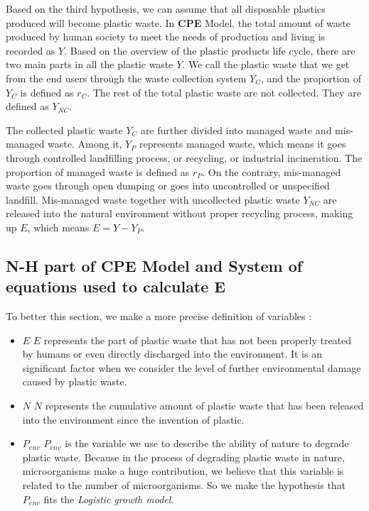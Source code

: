 \documentclass{mcmthesis}
\begin{document}
	 Based on the third hypothesis, we can assume that all disposable plastics produced will become plastic waste. In \textbf{CPE} Model, the total amount of waste produced by human society to meet the needs of production and living is recorded as $Y$. Based on the overview of the plastic products life cycle, there are two main parts in all the plastic waste $Y$. We call the plastic waste that we get from the end users through the waste collection system $Y_{C}$, and the proportion of $Y_C$ is defined as $r_C$. The rest of the total plastic waste are not collected. They are defined as $Y_{NC}$. 
	
	The collected plastic waste $Y_C$ are further divided into managed waste and mis-managed waste. Among it, $Y_P$ represents managed waste, which means it goes through controlled landfilling process, or recycling, or industrial incineration. The proportion of managed waste is defined as $r_P$. On the contrary, mis-managed waste goes through open dumping or goes into uncontrolled or unspecified landfill. Mis-managed waste together with uncollected plastic waste $Y_{NC}$ are released into the natural environment without proper recycling process, making up $E$, which means $E=Y-Y_P$.
	   

 \subsection{N-H part of CPE Model and System of equations used to calculate E}
	   
	   To better this section, we make a more precise definition of variables :
	    \begin{itemize}
	      \item$E$ \qquad $E$ represents the part of plastic waste that has not been properly treated by humans or even directly discharged into the environment. It is an significant factor when we consider the level of further environmental damage caused by plastic waste.\\
	  
	      \item$N$ \qquad $N$ represents the cumulative amount of plastic waste that has been released into the environment since the invention of plastic.\\
	  
	      \item $P_{env}$ \quad $P_{env}$ is the variable we use to describe the ability of nature to degrade plastic waste. Because in the process of degrading plastic waste in nature, microorganisms make a huge contribution, we believe that this variable is related to the number of microorganisms. So we make the hypothesis that $P_{env}$ fits the \textit{Logistic growth model}. 
	    \end{itemize}
\end{document}
